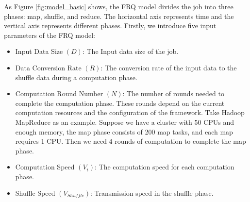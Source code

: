 {{%
As Figure \ref{fig:model_basic} shows, the FRQ model divides the job into three phases: map, shuffle, and reduce.
The horizontal axis represents time and the vertical axis represents different phases.
Firstly, we introduce five input parameters of the FRQ model:
}
\begin{itemize}
	\item Input Data Size \((D)\): The  Input data size of the job.
	\item Data Conversion Rate \((R)\): The conversion rate of the input data to the shuffle data during a computation phase.
    \item Computation Round Number \((N)\): The number of rounds needed to complete the computation phase. These rounds depend on the current computation resources and the configuration of the framework. Take Hadoop MapReduce as an example. Suppose we have a cluster with 50 CPUs and enough memory, the map phase consists of 200 map tasks, and each map requires 1 CPU. Then we need 4 rounds of computation to complete the map phase.
    \item Computation Speed \((V_{i})\): 
	The computation speed for each computation phase.
    \item Shuffle Speed \((V_{Shuffle})\): 
	Transmission speed in the shuffle phase.
\end{itemize}

}
